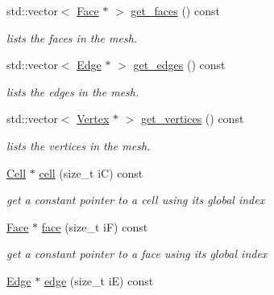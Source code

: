 \begin{DoxyCompactItemize}
std\+::vector$<$ \hyperlink{classHArDCore3D_1_1Face}{Face} $\ast$ $>$ \hyperlink{group__Mesh_gab61b9310613e48727c099a7162b79511}{get\+\_\+faces} () const
\begin{DoxyCompactList}\small\item\em lists the faces in the mesh. \end{DoxyCompactList}\item 
std\+::vector$<$ \hyperlink{classHArDCore3D_1_1Edge}{Edge} $\ast$ $>$ \hyperlink{group__Mesh_ga0fa81aa91495ca87dd8b134ee46d25fa}{get\+\_\+edges} () const
\begin{DoxyCompactList}\small\item\em lists the edges in the mesh. \end{DoxyCompactList}\item 
std\+::vector$<$ \hyperlink{classHArDCore3D_1_1Vertex}{Vertex} $\ast$ $>$ \hyperlink{group__Mesh_ga7809eef99241a3a111d4570f1b388621}{get\+\_\+vertices} () const
\begin{DoxyCompactList}\small\item\em lists the vertices in the mesh. \end{DoxyCompactList}\item 
\mbox{\label{classHArDCore3D_1_1Mesh_ae07b938c57cf57e3bb9c76d3df1eb549}} 
\hyperlink{classHArDCore3D_1_1Cell}{Cell} $\ast$ \hyperlink{classHArDCore3D_1_1Mesh_ae07b938c57cf57e3bb9c76d3df1eb549}{cell} (size\+\_\+t iC) const
\begin{DoxyCompactList}\small\item\em get a constant pointer to a cell using its global index \end{DoxyCompactList}\item 
\mbox{\label{classHArDCore3D_1_1Mesh_a09d8a0ee1f515991b06a3517e33a894e}} 
\hyperlink{classHArDCore3D_1_1Face}{Face} $\ast$ \hyperlink{classHArDCore3D_1_1Mesh_a09d8a0ee1f515991b06a3517e33a894e}{face} (size\+\_\+t iF) const
\begin{DoxyCompactList}\small\item\em get a constant pointer to a face using its global index \end{DoxyCompactList}\item 
\mbox{\label{classHArDCore3D_1_1Mesh_acad7cdf3d2c00fa6fc23ff77c63c7d1a}} 
\hyperlink{classHArDCore3D_1_1Edge}{Edge} $\ast$ \hyperlink{classHArDCore3D_1_1Mesh_acad7cdf3d2c00fa6fc23ff77c63c7d1a}{edge} (size\+\_\+t iE) const

\end{DoxyCompactItemize}
